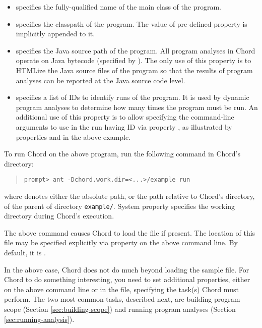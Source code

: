 \begin{itemize}
\item
{} specifies the fully-qualified name of the main class of the
program.
\item
{} specifies the classpath of the program.
The value of pre-defined property  is implicitly appended
to it.
\item
{} specifies the Java source path of the program.
All program analyses in Chord operate on Java bytecode (specified by ).
The only use of this property is to HTMLize the Java source files of the program so that the
results of program analyses can be reported at the Java source code level.
\item
{} specifies a list of IDs to identify runs of the program.
It is used by dynamic program analyses to determine how many times the program must be run.
An additional use of this property is to allow specifying the command-line arguments to use
in the run having ID  via property , as illustrated by
properties  and  in the above example.
\end{itemize}

To run Chord on the above program, run the following command in Chord's  directory:

\begin{quote}
\begin{verbatim}
prompt> ant -Dchord.work.dir=<...>/example run
\end{verbatim}
\end{quote}

\noindent where  denotes either the absolute path, or the path relative to Chord's  directory,
of the parent of directory {\tt example/}.
System property  specifies the working directory during Chord's execution.

The above command causes Chord to load the  file if present.
The location of this file may be specified explicitly via property
 on the above command line.
By default, it is .

In the above case, Chord does not do much beyond loading the sample  file.
For Chord to do something interesting, you need to set additional properties, either
on the above command line or in the  file, specifying the task(s)
Chord must perform.
The two most common tasks, described next, are building program scope (Section \ref{sec:building-scope})
and running program analyses (Section \ref{sec:running-analysis}).

